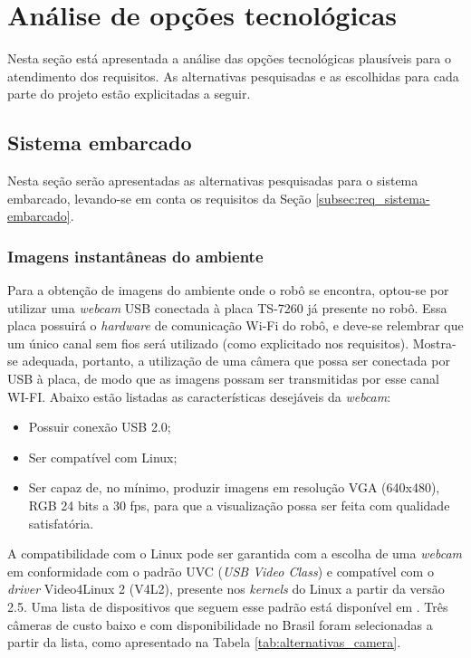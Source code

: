 \section{Análise de opções tecnológicas}

Nesta seção está apresentada a análise das opções tecnológicas plausíveis para o atendimento dos requisitos. As alternativas pesquisadas e as escolhidas para cada parte do projeto estão explicitadas a seguir.

\subsection{Sistema embarcado}
\label{subsec:opcoes_sist-embarcado}
Nesta seção serão apresentadas as alternativas pesquisadas para o sistema embarcado, levando-se em conta os requisitos da Seção \ref{subsec:req_sistema-embarcado}.

\subsubsection{Imagens instantâneas do ambiente}

Para a obtenção de imagens do ambiente onde o robô se encontra, optou-se por utilizar uma \textit{webcam} USB conectada à placa TS-7260 já presente no robô. Essa placa possuirá o \textit{hardware} de comunicação Wi-Fi do robô, e deve-se relembrar que um único canal sem fios será utilizado (como explicitado nos requisitos). Mostra-se adequada, portanto, a utilização de uma câmera que possa ser conectada por USB à placa, de modo que as imagens possam ser transmitidas por esse canal WI-FI. Abaixo estão listadas as características desejáveis da \textit{webcam}:

\begin{itemize}
  \item Possuir conexão USB 2.0;
  \item Ser compatível com Linux;
  \item Ser capaz de, no mínimo, produzir imagens em resolução VGA (640x480), RGB 24 bits a 30 fps, para que a visualização possa ser feita com qualidade satisfatória.
\end{itemize}

A compatibilidade com o Linux pode ser garantida com a escolha de uma \textit{webcam} em conformidade com o padrão UVC (\textit{USB Video Class}) e compatível com o \textit{driver} Video4Linux 2 (V4L2), presente nos \textit{kernels} do Linux a partir da versão 2.5. Uma lista de dispositivos que seguem esse padrão está disponível em \cite{uvc-linux}. Três câmeras de custo baixo e com disponibilidade no Brasil foram selecionadas a partir da lista, como apresentado na Tabela \ref{tab:alternativas_camera}.


